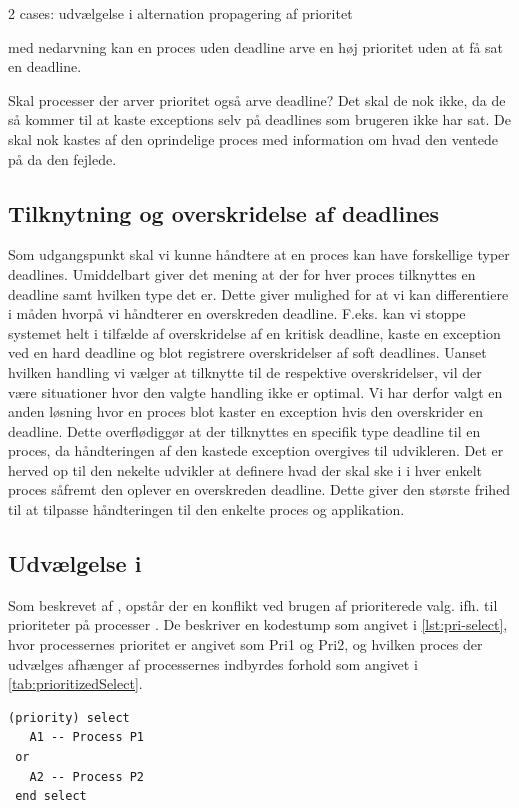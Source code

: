 2 cases:
udvælgelse i alternation
propagering af prioritet

med nedarvning kan en proces uden deadline arve en høj prioritet uden at få sat en deadline. 

Skal processer der arver prioritet også arve deadline? Det skal de nok ikke, da de så kommer til at kaste exceptions selv på deadlines som brugeren ikke har sat. De skal nok kastes af den oprindelige proces med information om hvad den ventede på da den fejlede. 

\subsection{Tilknytning og overskridelse af deadlines}
Som udgangspunkt skal vi kunne håndtere at en proces kan have forskellige typer deadlines. Umiddelbart giver det mening at der for hver proces tilknyttes en deadline samt hvilken type det er. Dette giver mulighed for at vi kan differentiere i måden hvorpå vi håndterer en overskreden deadline. F.eks. kan vi stoppe systemet helt i tilfælde af overskridelse af en kritisk deadline, kaste en exception ved en hard deadline og blot registrere overskridelser af soft deadlines. Uanset hvilken handling vi vælger at tilknytte til de respektive overskridelser, vil der være situationer hvor den valgte handling ikke er optimal. Vi har derfor valgt en anden løsning hvor en proces blot kaster en exception hvis den overskrider en deadline. Dette overflødiggør at der tilknyttes en specifik type deadline til en proces, da håndteringen af den kastede exception overgives til udvikleren. Det er herved op til den nekelte udvikler at definere hvad der skal ske i i hver enkelt proces såfremt den oplever en overskreden deadline. Dette giver den største frihed til at tilpasse håndteringen til den enkelte proces og applikation. 

\subsection{Udvælgelse i }
Som  beskrevet af \citeauthor{Burns1990}, opstår der en konflikt ved brugen af  prioriterede valg. ifh. til prioriteter på processer \cite{Burns1990}. De beskriver en kodestump som angivet i \cref{lst:pri-select}, hvor processernes prioritet er angivet som Pri1 og Pri2, og hvilken proces der udvælges afhænger af processernes indbyrdes forhold som angivet i \cref{tab:prioritizedSelect}.


\begin{lstlisting}[firstnumber=1 ,float=hbtp, label=lst:pri-select, caption={ (priority) select. Eksemplet er kopieret fra \cite[160]{Burns1990}}]
(priority) select
   A1 -- Process P1
 or
   A2 -- Process P2
 end select
\end{lstlisting}

